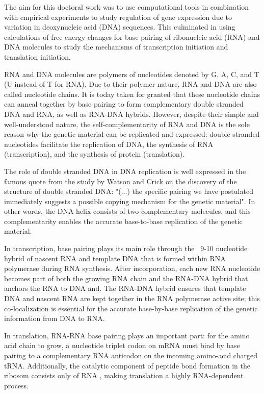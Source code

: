 %
The aim for this doctoral work was to use computational tools in combination
with empirical experiments to study regulation of gene expression due to
variation in deoxynucleic acid (DNA) sequences. This culminated in using
calculations of free energy changes for base pairing of ribonucleic acid (RNA)
and DNA molecules to study the mechanisms of transcription initiation and
translation initiation.

RNA and DNA molecules are polymers of nucleotides denoted by G, A, C, and T (U
instead of T for RNA). Due to their polymer nature, RNA and DNA are also called
nucleotide chains. It is today taken for granted that these nucleotide chains
can anneal together by base pairing to form complementary double stranded DNA
and RNA, as well as RNA-DNA hybrids. However, despite their simple and
well-understood nature, the self-complementarity of RNA and DNA is the sole
reason why the genetic material can be replicated and expressed: double
stranded nucleotides facilitate the replication of DNA, the synthesis of RNA
(transcription), and the synthesis of protein (translation).

The role of double stranded DNA in DNA replication is well expressed in the
famous quote from the study by Watson and Crick \cite{watson_molecular_1953} on
the discovery of the structure of double stranded DNA: "(...) the specific
pairing we have postulated immediately suggests a possible copying mechanism
for the genetic material". In other words, the DNA helix consists of two
complementary molecules, and this complementarity enables the accurate
base-to-base replication of the genetic material.

In transcription, base pairing plays its main role through the ~9-10 nucleotide
hybrid of nascent RNA and template DNA that is formed within RNA polymerase
\cite{vassylyev_structural_2007} during RNA synthesis. After incorporation,
each new RNA nucleotide becomes part of both the growing RNA chain and the
RNA-DNA hybrid that anchors the RNA to DNA and. The RNA-DNA hybrid ensures that
template DNA and nascent RNA are kept together in the RNA polymerase active
site; this co-localization is essential for the accurate base-by-base
replication of the genetic information from DNA to RNA.

In translation, RNA-RNA base pairing plays an important part: for the amino
acid chain to grow, a nucleotide triplet codon on mRNA must bind by base
pairing to a complementary RNA anticodon on the incoming amino-acid charged
tRNA. Additionally, the catalytic component of peptide bond formation in the
ribosom consists only of RNA \cite{steitz_rna_2003}, making translation a
highly RNA-dependent process.

